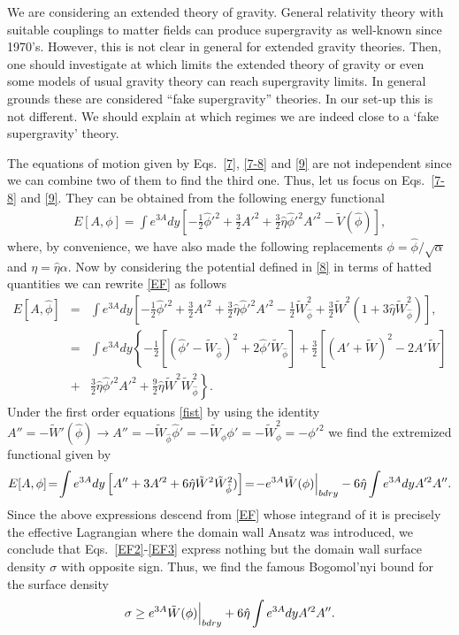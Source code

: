 \documentclass[aps,12pt, a4paper,nofootinbib]{revtex4}
\begin{document}
{We are considering an extended theory of gravity. General relativity theory with suitable couplings to matter fields can produce supergravity as well-known since 1970's. However, this is not clear in general for extended gravity theories. Then, one should investigate at which limits the extended theory of gravity or even some models of usual gravity theory can reach supergravity limits. In general grounds these are considered ``fake supergravity'' theories. In our set-up this is not different. We should explain at which regimes we are indeed close to a `fake supergravity' theory.

The equations of motion given by Eqs.~\eqref{7}, \eqref{7-8} and \eqref{9} are not independent since we can combine two of them to find the third one. Thus, let us focus on Eqs.~\eqref{7-8} and \eqref{9}. They can be obtained from the following energy functional
\begin{eqnarray}
E[A,\phi]=\int{e^{3A}dy\left[-\frac{1}{2}\hat{\phi}'^2+\frac32 A'^2+\frac32\hat{\eta}\hat{\phi}'^2A'^2-\tilde{V}(\hat{\phi})\right]},\label{EF}
\end{eqnarray}
where, by convenience, we have also made the following replacements $\phi=\hat{\phi}/\sqrt{\alpha}$ and $\eta=\hat{\eta}\alpha$. Now by considering the potential defined in \eqref{8} in terms of hatted quantities we can rewrite \eqref{EF} as follows
\begin{eqnarray}
E[A,\hat{\phi}]&=&\int{e^{3A}dy\left[-\frac{1}{2}\hat{\phi}'^2+\frac32 A'^2+\frac32\hat{\eta}\hat{\phi}'^2A'^2-\frac{1}{2}\tilde{W}_{\hat\phi}^{2}+\frac{3}{2}\tilde{W}^{2}(1+3\hat{\eta}\tilde{W}^{2}_{\hat\phi})\right]},\nonumber\\
&=&\int{e^{3A}dy\left\{-\frac{1}{2}\left[(\hat{\phi}'-\tilde{W}_{\hat\phi})^2+2\hat{\phi}'\tilde{W}_{\hat\phi}\right]+\frac32 \left[(A'+\tilde{W})^2-2A'\tilde{W}\right]\right.}\nonumber\\
&+&\left.\frac32\hat{\eta}\hat{\phi}'^2A'^2+\frac{9}{2}\hat{\eta}\tilde{W}^{2}\tilde{W}^{2}_{\hat\phi}\right\}.\label{EF2} 
\end{eqnarray} 
Under the first order equations \eqref{fist} by using the identity $A''=-\tilde{W}'(\hat{\phi})\to A''=-\tilde{W}_{\hat\phi}\hat{\phi}' =-\tilde{W}_{\phi}{\phi}' = - \tilde{W}_{\phi}^2=-{\phi}'^2$ we find the extremized functional given by 
\begin{eqnarray}
E[A,\phi]\!=\!\int{e^{3A}dy\left[A''+3A'^2+6\hat{\eta}\tilde{W}^{2}\tilde{W}^{2}_{\hat\phi})\right]}\!=\!-e^{3A}\tilde{W}({\phi})\Big{|}_{bdry}-6\hat{\eta}\int{e^{3A}dyA'^{2}A''}.\label{EF3}
\end{eqnarray}
Since the above expressions descend from \eqref{EF} whose integrand of it is precisely the effective Lagrangian where the domain wall Ansatz was introduced, we conclude that Eqs.~\eqref{EF2}-\eqref{EF3} express nothing but the domain wall surface density $\sigma$ with opposite sign. Thus, we find the famous Bogomol'nyi bound for the surface density
\begin{eqnarray}
\sigma\geq
e^{3A}\tilde{W}({\phi})\Big{|}_{bdry}+6\hat{\eta}\int{e^{3A}dyA'^{2}A''}.\label{EF3-sigma}
\end{eqnarray}

}
\end{document}
